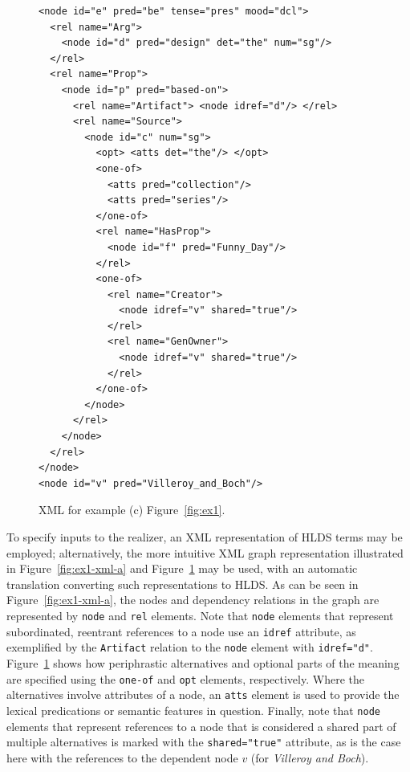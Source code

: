 \documentclass[11pt]{article}
\newcommand{\figref}[1]{Figure~\ref{fig:#1}} %
\begin{document}
\begin{figure}%
\begin{footnotesize}
\begin{verbatim}
<node id="e" pred="be" tense="pres" mood="dcl">
  <rel name="Arg"> 
    <node id="d" pred="design" det="the" num="sg"/>
  </rel>
  <rel name="Prop">
    <node id="p" pred="based-on">
      <rel name="Artifact"> <node idref="d"/> </rel>
      <rel name="Source"> 
        <node id="c" num="sg">
          <opt> <atts det="the"/> </opt>
          <one-of>
            <atts pred="collection"/> 
            <atts pred="series"/>
          </one-of>
          <rel name="HasProp"> 
            <node id="f" pred="Funny_Day"/>
          </rel>
          <one-of>
            <rel name="Creator"> 
              <node idref="v" shared="true"/> 
            </rel> 
            <rel name="GenOwner">
              <node idref="v" shared="true"/> 
            </rel> 
          </one-of>
        </node>
      </rel>
    </node>
  </rel>
</node>
<node id="v" pred="Villeroy_and_Boch"/>
\end{verbatim}
\end{footnotesize}

\caption{XML for example (c) \figref{ex1}.}
\label{fig:ex1-xml-c}
\end{figure}

To specify inputs to the realizer, an XML representation of HLDS terms
may be employed; alternatively, the more intuitive XML graph
representation illustrated in \figref{ex1-xml-a} and \figref{ex1-xml-c}
may be used, with an automatic translation converting such
representations to HLDS. As can be seen in \figref{ex1-xml-a}, the nodes
and dependency relations in the graph are represented by \texttt{node}
and \texttt{rel} elements. Note that \texttt{node} elements that
represent subordinated, reentrant references to a node use an
\texttt{idref} attribute, as exemplified by the \texttt{Artifact}
relation to the \texttt{node} element with \texttt{idref="d"}.
\figref{ex1-xml-c} shows how periphrastic alternatives and optional
parts of the meaning are specified using the \texttt{one-of} and
\texttt{opt} elements, respectively. Where the alternatives involve
attributes of a node, an \texttt{atts} element is used to provide the
lexical predications or semantic features in question. Finally, note
that \texttt{node} elements that represent references to a node that is
considered a shared part of multiple alternatives is marked with the
\texttt{shared="true"} attribute, as is the case here with the
references to the dependent node $v$ (for \textit{Villeroy and Boch}).






\end{document}
